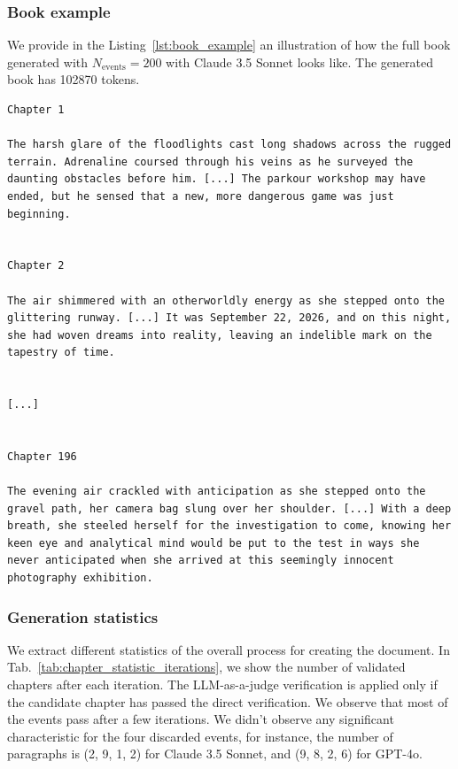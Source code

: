 \documentclass{article}
\begin{document}
\subsubsection{Book example}\label{app:1book:bookexample}

We provide in the Listing~\ref{lst:book_example} an illustration of how the full book generated with $N_{\text{events}} = 200$ with Claude 3.5 Sonnet looks like. The generated book has 102870 tokens.

\begin{lstlisting}[style=mystyle, caption={Complete document generated with Claude 3.5 Sonnet with $N_{\text{events}} = 200$. There are only 196 chapters because 4 events did not pass the verifications after 10 iterations. Ellipses are indicated with between brackets.}, label={lst:book_example}]
Chapter 1

The harsh glare of the floodlights cast long shadows across the rugged terrain. Adrenaline coursed through his veins as he surveyed the daunting obstacles before him. [...] The parkour workshop may have ended, but he sensed that a new, more dangerous game was just beginning.


Chapter 2

The air shimmered with an otherworldly energy as she stepped onto the glittering runway. [...] It was September 22, 2026, and on this night, she had woven dreams into reality, leaving an indelible mark on the tapestry of time.


[...]


Chapter 196

The evening air crackled with anticipation as she stepped onto the gravel path, her camera bag slung over her shoulder. [...] With a deep breath, she steeled herself for the investigation to come, knowing her keen eye and analytical mind would be put to the test in ways she never anticipated when she arrived at this seemingly innocent photography exhibition.
\end{lstlisting}

\subsubsection{Generation statistics}\label{app:1book:statistics}

We extract different statistics of the overall process for creating the document. In Tab.~\ref{tab:chapter_statistic_iterations}, we show the number of validated chapters after each iteration. The LLM-as-a-judge verification is applied only if the candidate chapter has passed the direct verification. We observe that most of the events pass after a few iterations.
We didn't observe any significant characteristic for the four discarded events, for instance, the number of paragraphs is (2, 9, 1, 2) for Claude 3.5 Sonnet, and (9, 8, 2, 6) for GPT-4o.
\end{document}
